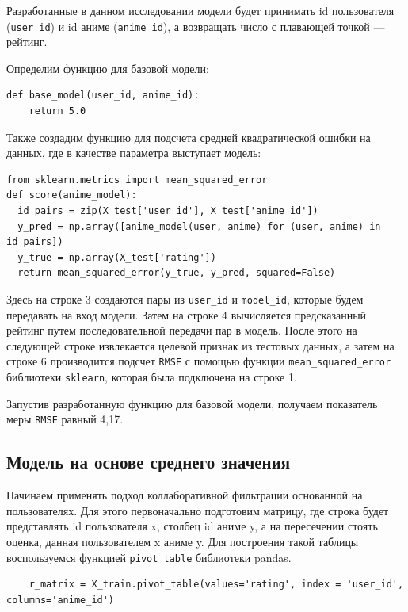 \documentclass[bachelor, och, diploma]{SCWorks}
\begin{document}
Разработанные в данном исследовании модели будет принимать id пользователя (\verb|user_id|) и id аниме (\verb|anime_id|), а возвращать число с плавающей точкой --- рейтинг.

Определим функцию для базовой модели:
\begin{verbatim}
def base_model(user_id, anime_id):
  	return 5.0
\end{verbatim}

Также создадим функцию для подсчета средней квадратической ошибки на данных, где в качестве параметра выступает модель:


\begin{verbatim}
from sklearn.metrics import mean_squared_error
def score(anime_model):
  id_pairs = zip(X_test['user_id'], X_test['anime_id'])
  y_pred = np.array([anime_model(user, anime) for (user, anime) in id_pairs])
  y_true = np.array(X_test['rating'])
  return mean_squared_error(y_true, y_pred, squared=False)
	\end{verbatim}

Здесь на строке 3 создаются пары из \verb|user_id| и \verb|model_id|, которые будем передавать на вход модели. Затем на строке 4 вычисляется
 предсказанный рейтинг путем последовательной передачи пар в модель. После этого на следующей строке извлекается целевой признак из тестовых данных,
  а затем на строке 6 производится подсчет \verb|RMSE| с помощью функции \verb|mean_squared_error| библиотеки \verb|sklearn|, которая была подключена на строке 1.

Запустив разработанную функцию для базовой модели, получаем показатель меры \verb|RMSE| равный 4,17.

\subsection{Модель на основе среднего значения}

Начинаем применять подход коллаборативной фильтрации основанной на пользователях. Для этого первоначально подготовим матрицу, где строка будет представлять id пользователя x, столбец id аниме y, а на пересечении стоять оценка, данная пользователем x аниме y. Для построения такой таблицы воспользуемся функцией
 \verb|pivot_table| библиотеки pandas.

\begin{verbatim}
	r_matrix = X_train.pivot_table(values='rating', index = 'user_id', columns='anime_id')
\end{verbatim}
\end{document}
